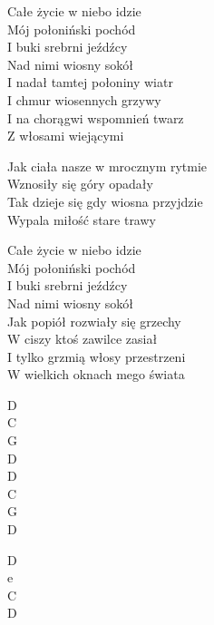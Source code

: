 \begin{text}
    Całe życie w niebo idzie\\
    Mój połoniński pochód\\
    I buki srebrni jeźdźcy\\
    Nad nimi wiosny sokół\\
    I nadał tamtej połoniny wiatr\\
    I chmur wiosennych grzywy\\
    I na chorągwi wspomnień twarz\\
    Z włosami wiejącymi

    \vin Jak ciała nasze w mrocznym rytmie\\
    \vin Wznosiły się góry opadały\\
    \vin Tak dzieje się gdy wiosna przyjdzie\\
    \vin Wypala miłość stare trawy

    Całe życie w niebo idzie\\
    Mój połoniński pochód\\
    I buki srebrni jeźdźcy\\
    Nad nimi wiosny sokół\\
    Jak popiół rozwiały się grzechy\\
    W ciszy ktoś zawilce zasiał\\
    I tylko grzmią włosy przestrzeni\\
    W wielkich oknach mego świata
\end{text}
\begin{chord}
    D\\
    C\\
    G\\
    D\\
    D\\
    C\\
    G\\
    D

    D\\
    e\\
    C\\
    D
\end{chord}